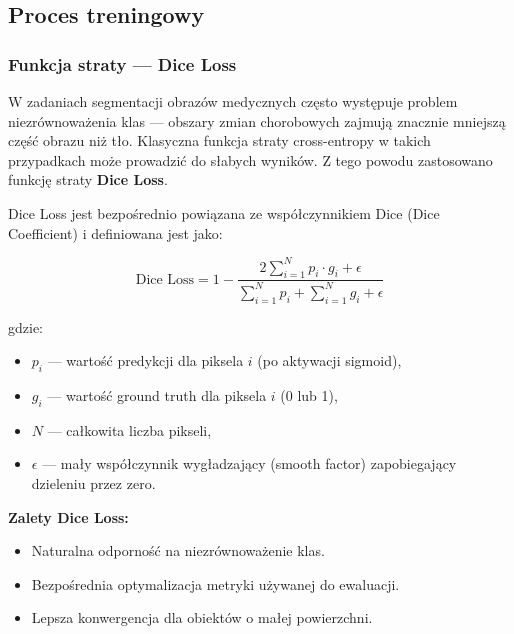 \documentclass[12pt,a4paper]{article}
\begin{document}
\subsection{Proces treningowy}

\subsubsection{Funkcja straty — Dice Loss}
W zadaniach segmentacji obrazów medycznych często występuje problem niezrównoważenia klas — obszary zmian chorobowych zajmują znacznie mniejszą część obrazu niż tło. Klasyczna funkcja straty cross-entropy w takich przypadkach może prowadzić do słabych wyników. Z tego powodu zastosowano funkcję straty \textbf{Dice Loss}.

Dice Loss jest bezpośrednio powiązana ze współczynnikiem Dice (Dice Coefficient) i definiowana jest jako:

\begin{equation}
\text{Dice Loss} = 1 - \frac{2 \sum_{i=1}^{N} p_i \cdot g_i + \epsilon}{\sum_{i=1}^{N} p_i + \sum_{i=1}^{N} g_i + \epsilon}
\end{equation}

gdzie:
\begin{itemize}
    \item $p_i$ — wartość predykcji dla piksela $i$ (po aktywacji sigmoid),
    \item $g_i$ — wartość ground truth dla piksela $i$ (0 lub 1),
    \item $N$ — całkowita liczba pikseli,
    \item $\epsilon$ — mały współczynnik wygładzający (smooth factor) zapobiegający dzieleniu przez zero.
\end{itemize}

\textbf{Zalety Dice Loss:}
\begin{itemize}
    \item Naturalna odporność na niezrównoważenie klas.
    \item Bezpośrednia optymalizacja metryki używanej do ewaluacji.
    \item Lepsza konwergencja dla obiektów o małej powierzchni.
\end{itemize}
\end{document}
